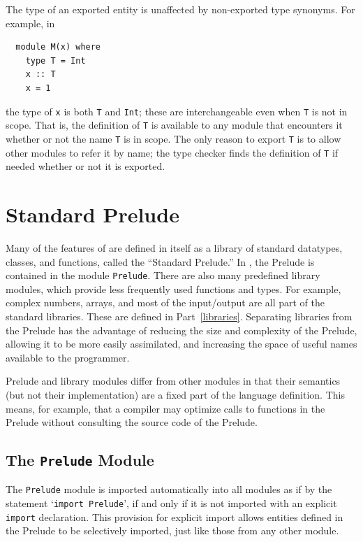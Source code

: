 The type of an exported entity is unaffected by non-exported type
synonyms.  For example, in
\bprog
{\small\begin{verbatim}
  module M(x) where
    type T = Int
    x :: T
    x = 1
\end{verbatim}}
\eprog
the type of \mbox{\tt x} is both \mbox{\tt T} and \mbox{\tt Int}; these are interchangeable even
when \mbox{\tt T} is not in scope.  That is, the definition of \mbox{\tt T} is available
to any module that encounters it whether or not the name \mbox{\tt T} is
in scope.  The only reason to export \mbox{\tt T} is to allow other modules to
refer it by name; the type checker finds the definition of \mbox{\tt T} if
needed whether or not it is exported.

\section{Standard Prelude}
\label{standard-prelude}
Many of the features of \Haskell{} are defined in \Haskell{}
itself as a library of standard datatypes, classes, and
functions, called the ``Standard Prelude.''  In
\Haskell{}, the Prelude is contained in the
module \mbox{\tt Prelude}. There are also
many predefined library modules, which provide less frequently used
functions and types.  For example, complex numbers, arrays, 
and most of the input/output are all part of the standard
libraries.    These are 
defined in Part~\ref{libraries}.
Separating
libraries from the Prelude has the advantage of reducing the size and
complexity of the Prelude, allowing it to be more easily assimilated,
and increasing the space of useful names available to the programmer.

Prelude and library modules differ from other modules in that
their semantics (but not their implementation) are a fixed part of the
\Haskell{} language definition.
This means, for example, that a compiler may optimize calls to
functions in the Prelude without consulting the source code
of the Prelude.

\subsection{The \texorpdfstring{\mbox{\tt Prelude}}{Prelude} Module}

The \mbox{\tt Prelude} module is imported automatically into all modules as if
by the statement `\mbox{\tt import\ Prelude}', if and only if it is not imported
with an explicit \mbox{\tt import} declaration. This provision for explicit
import allows entities defined in the Prelude to be selectively imported,
just like those from any other module.

